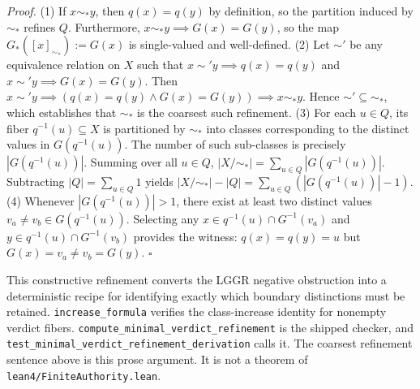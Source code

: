 \documentclass[
  10pt,
]{article}
\DeclareRobustCommand{\texttt}[1]{{\paperSymbolFont\nolinkurl{#1}}}
\begin{document}
\emph{Proof.} (1) If \protect\hypertarget{math-E0075-0091}{}{\(x \sim_* y\)}, then \protect\hypertarget{math-E0073-0092}{}{\(q(x) = q(y)\)} by definition, so the partition induced by \protect\hypertarget{math-E0062-0093}{}{\(\sim_*\)} refines \protect\hypertarget{math-E0059-0094}{}{\(Q\)}. Furthermore, \protect\hypertarget{math-E0076-0095}{}{\(x \sim_* y \implies G(x) = G(y)\)}, so the map \protect\hypertarget{math-E0077-0096}{}{\(G_*([x]_{\sim_*}) := G(x)\)} is single-valued and well-defined. (2) Let \protect\hypertarget{math-E0067-0097}{}{\(\sim'\)} be any equivalence relation on \protect\hypertarget{math-E0061-0098}{}{\(X\)} such that \protect\hypertarget{math-E0078-0099}{}{\(x \sim' y \implies q(x) = q(y)\)} and \protect\hypertarget{math-E0079-0100}{}{\(x \sim' y \implies G(x) = G(y)\)}. Then \protect\hypertarget{math-E0080-0101}{}{\(x \sim' y \implies (q(x) = q(y) \land G(x) = G(y)) \implies x \sim_* y\)}. Hence \protect\hypertarget{math-E0070-0102}{}{\(\sim' \subseteq \sim_*\)}, which establishes that \protect\hypertarget{math-E0062-0103}{}{\(\sim_*\)} is the coarsest such refinement. (3) For each \protect\hypertarget{math-E0081-0104}{}{\(u \in Q\)}, its fiber \protect\hypertarget{math-E0082-0105}{}{\(q^{-1}(u) \subseteq X\)} is partitioned by \protect\hypertarget{math-E0062-0106}{}{\(\sim_*\)} into classes corresponding to the distinct values in \protect\hypertarget{math-E0083-0107}{}{\(G(q^{-1}(u))\)}. The number of such sub-classes is precisely \protect\hypertarget{math-E0084-0108}{}{\(|G(q^{-1}(u))|\)}. Summing over all \protect\hypertarget{math-E0081-0109}{}{\(u \in Q\)}, \protect\hypertarget{math-E0085-0110}{}{\(|X / {\sim_*}| = \sum_{u \in Q} |G(q^{-1}(u))|\)}. Subtracting \protect\hypertarget{math-E0086-0111}{}{\(|Q| = \sum_{u \in Q} 1\)} yields \protect\hypertarget{math-E0087-0112}{}{\(|X / {\sim_*}| - |Q| = \sum_{u \in Q} (|G(q^{-1}(u))| - 1)\)}. (4) Whenever \protect\hypertarget{math-E0088-0113}{}{\(|G(q^{-1}(u))| > 1\)}, there exist at least two distinct values \protect\hypertarget{math-E0089-0114}{}{\(v_a \neq v_b \in G(q^{-1}(u))\)}. Selecting any \protect\hypertarget{math-E0090-0115}{}{\(x \in q^{-1}(u) \cap G^{-1}(v_a)\)} and \protect\hypertarget{math-E0091-0116}{}{\(y \in q^{-1}(u) \cap G^{-1}(v_b)\)} provides the witness: \protect\hypertarget{math-E0092-0117}{}{\(q(x) = q(y) = u\)} but \protect\hypertarget{math-E0093-0118}{}{\(G(x) = v_a \neq v_b = G(y)\)}. \protect\hypertarget{math-E0094-0119}{}{\(\square\)}

This constructive refinement converts the LGGR negative obstruction into a deterministic recipe for identifying exactly which boundary distinctions must be retained. \texttt{increase\_formula} verifies the class-increase identity for nonempty verdict fibers. \texttt{compute\_minimal\_verdict\_refinement} is the shipped checker, and \texttt{test\_minimal\_verdict\_refinement\_derivation} calls it. The coarsest refinement sentence above is this prose argument. It is not a theorem of \texttt{lean4/FiniteAuthority.lean}.
\end{document}

